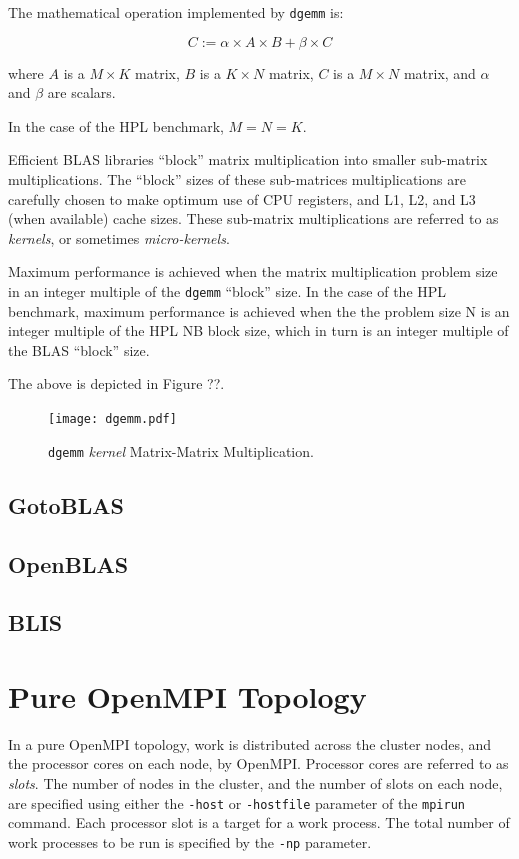 \documentclass{report}
\begin{document}
The mathematical operation implemented by \verb|dgemm| is:

\[C := \alpha \times A \times B + \beta \times C\]

where $A$ is a $M \times K$ matrix, $B$ is a $K \times N$ matrix, $C$ is a $M \times N$ matrix, and $\alpha$ and $\beta$ are scalars.

In the case of the HPL benchmark, $M = N = K$.

Efficient BLAS libraries ``block'' matrix multiplication into smaller sub-matrix multiplications. The ``block'' sizes of these sub-matrices multiplications are carefully chosen to make optimum use of CPU registers, and L1, L2, and L3 (when available) cache sizes. These sub-matrix multiplications are referred to as \emph{kernels}, or sometimes \emph{micro-kernels}.

Maximum performance is achieved when the matrix multiplication problem size in an integer multiple of the \verb|dgemm| ``block'' size. In the case of the HPL benchmark, maximum performance is achieved when the the problem size N is an integer multiple of the HPL NB block size, which in turn is an integer multiple of the BLAS ``block'' size.

The above is depicted in Figure ??.

\begin{figure}
	\centering
	\texttt{[image: dgemm.pdf]}
	\caption{\texttt{dgemm} \emph{kernel} Matrix-Matrix Multiplication.}
	\label{fig:image2}
\end{figure}


%
%
\subsection{GotoBLAS}


%
%
\subsection{OpenBLAS}


%
%
\subsection{BLIS}


%
%
\section{Pure OpenMPI Topology}

In a pure OpenMPI topology, work is distributed across the cluster nodes, and the processor cores on each node, by OpenMPI. Processor cores are referred to as \emph{slots}. The number of nodes in the cluster, and the number of slots on each node, are specified using either the \verb|-host| or \verb|-hostfile| parameter of the \verb|mpirun| command. Each processor slot is a target for a work process. The total number of work processes to be run is specified by the \verb|-np| parameter.
\end{document}
